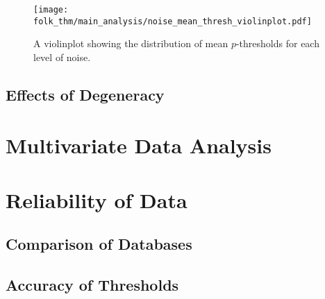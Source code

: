 \begin{figure}
    \centering
    \texttt{[image: folk\_thm/main\_analysis/noise\_mean\_thresh\_violinplot.pdf]}
    \caption{A violinplot showing the distribution of mean \(p\)-thresholds for each level of noise.}\label{fig:noise_mean_thresh_violinplot}
\end{figure}



\subsection{Effects of Degeneracy}\label{subsec:Effects_of_Degeneracy}

\section{Multivariate Data Analysis}\label{sec:MV_Data_Analysis}

\section{Reliability of Data}\label{sec:Reliability_of_Data}

\subsection{Comparison of Databases}\label{subsec:Comparison_of_Databases}

\subsection{Accuracy of Thresholds}\label{subsec:Accuracy_of_Thresholds}
